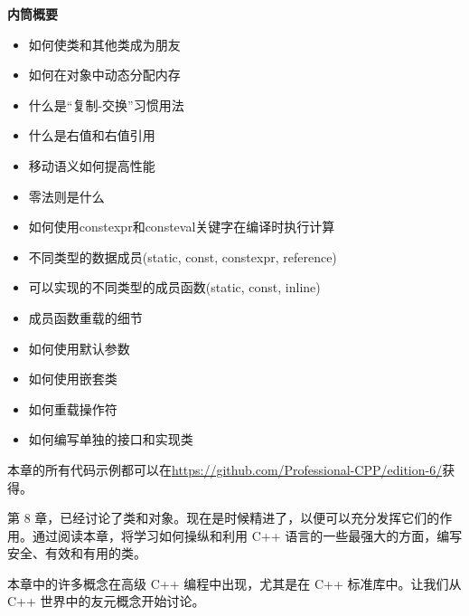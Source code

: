 \noindent
\textbf{内筒概要}

\begin{itemize}
\item
如何使类和其他类成为朋友

\item
如何在对象中动态分配内存

\item
什么是“复制-交换”习惯用法

\item
什么是右值和右值引用

\item
移动语义如何提高性能

\item
零法则是什么

\item
如何使用constexpr和consteval关键字在编译时执行计算

\item
不同类型的数据成员(static, const, constexpr, reference)

\item
可以实现的不同类型的成员函数(static, const, inline)

\item
成员函数重载的细节

\item
如何使用默认参数

\item
如何使用嵌套类

\item
如何重载操作符

\item
如何编写单独的接口和实现类
\end{itemize}

本章的所有代码示例都可以在\url{https://github.com/Professional-CPP/edition-6/}获得。

第 8 章，已经讨论了类和对象。现在是时候精进了，以便可以充分发挥它们的作用。通过阅读本章，将学习如何操纵和利用 C++ 语言的一些最强大的方面，编写安全、有效和有用的类。

本章中的许多概念在高级 C++ 编程中出现，尤其是在 C++ 标准库中。让我们从 C++ 世界中的友元概念开始讨论。














